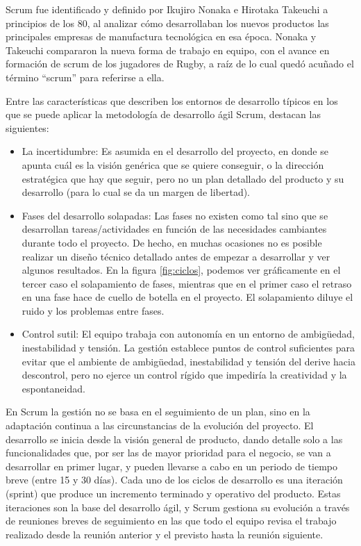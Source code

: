 Scrum fue identificado y definido por Ikujiro Nonaka e Hirotaka Takeuchi a principios de los 80, al analizar cómo desarrollaban los nuevos productos las principales empresas de manufactura tecnológica en esa época. Nonaka y Takeuchi compararon la nueva forma de trabajo en equipo, con el avance en formación de scrum de los jugadores de Rugby, a raíz de lo cual quedó acuñado el término “scrum” para referirse a ella.

Entre las características que describen los entornos de desarrollo típicos en los que se puede aplicar la metodología de desarrollo ágil Scrum, destacan las siguientes:

\begin{itemize}
\item La incertidumbre: Es asumida en el desarrollo del proyecto, en donde se apunta cuál es la visión genérica que se quiere conseguir, o la dirección estratégica que hay que seguir, pero no un plan detallado del producto y su desarrollo (para lo cual se da un margen de libertad).
\item Fases del desarrollo solapadas: Las fases no existen como tal sino que se desarrollan tareas/actividades en función de las necesidades cambiantes durante todo el proyecto. De hecho, en muchas ocasiones no es posible realizar un diseño técnico detallado antes de empezar a desarrollar y ver algunos resultados. En la figura \ref{fig:ciclos}, podemos ver gráficamente en el tercer caso el solapamiento de fases, mientras que en el primer caso el retraso en una fase hace de cuello de botella en el proyecto. El solapamiento diluye el ruido y los problemas entre fases.
\item Control sutil: El equipo trabaja con autonomía en un entorno de ambigüedad, inestabilidad y tensión. La gestión establece puntos de control suficientes para evitar que el ambiente de ambigüedad, inestabilidad y tensión del derive hacia descontrol, pero no ejerce un control rígido que impediría la creatividad y la espontaneidad.
\end{itemize}

En Scrum la gestión no se basa en el seguimiento de un plan, sino en la adaptación continua a las circunstancias de la evolución del proyecto. El desarrollo se inicia desde la visión general de producto, dando detalle  solo a las funcionalidades que, por ser las de mayor prioridad para el negocio, se van a desarrollar en primer lugar, y pueden llevarse a cabo en un periodo de tiempo breve (entre 15 y 30 días). Cada uno de los ciclos de desarrollo es una iteración (sprint) que produce un incremento terminado y operativo del producto. Estas iteraciones son la base del desarrollo ágil, y Scrum gestiona su evolución a través de reuniones breves de seguimiento en las que todo el equipo revisa el trabajo realizado desde la reunión anterior y el previsto hasta la reunión siguiente.

